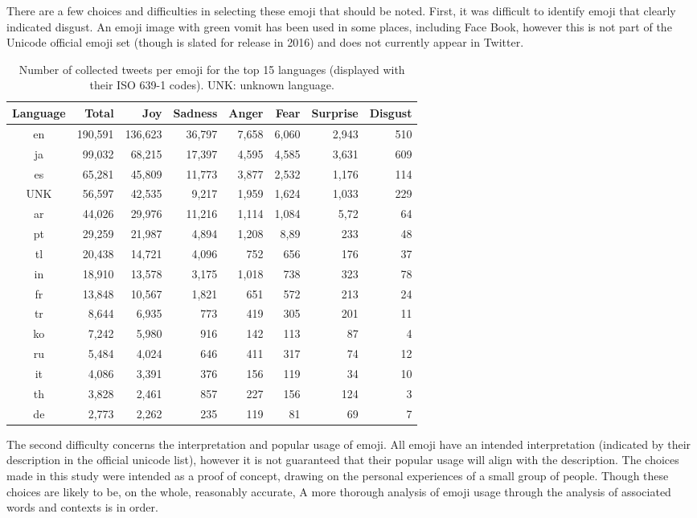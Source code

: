 \documentclass[10pt, a4paper]{article}
\begin{document}
There are a few choices and difficulties in selecting these emoji that should be noted.
First, it was difficult to identify emoji that clearly indicated disgust. 
An emoji image with green vomit has been used in some places, including Face Book, however this is not part of the Unicode official emoji set (though is slated for release in 2016) and does not currently appear in Twitter.

\begin{table*}
\centering
	\begin{tabular}{c | r | r | r | r | r | r | r}
\textbf{Language} & \textbf{Total} & \textbf{Joy} & \textbf{Sadness} & \textbf{Anger} & \textbf{Fear} & \textbf{Surprise} & \textbf{Disgust}  \\\hline
en  & 190,591 & 136,623 & 36,797 & 7,658 & 6,060 & 2,943 & 510 \\
ja  & 99,032 & 68,215 & 17,397 & 4,595 & 4,585 & 3,631 & 609 \\
es  & 65,281 & 45,809 & 11,773 & 3,877 & 2,532 & 1,176 & 114 \\
UNK  & 56,597 & 42,535 & 9,217 & 1,959 & 1,624 & 1,033 & 229\\
ar  & 44,026 & 29,976 & 11,216 & 1,114 & 1,084 & 5,72 & 64 \\
pt  & 29,259 & 21,987 & 4,894 & 1,208 & 8,89 & 233 & 48 \\
tl  & 20,438 & 14,721 & 4,096 & 752 & 656 & 176 & 37 \\
in  & 18,910 & 13,578 & 3,175 & 1,018 & 738 & 323 & 78 \\
fr  & 13,848 & 10,567 & 1,821 & 651 & 572 & 213 & 24\\
tr  & 8,644 & 6,935 & 773 & 419 & 305 & 201 & 11\\
ko  & 7,242 & 5,980 & 916 & 142 & 113 & 87 & 4\\
ru  & 5,484 & 4,024 & 646 & 411 & 317 & 74 & 12\\
it  & 4,086 & 3,391 & 376 & 156 & 119 & 34 & 10 \\
th  & 3,828 & 2,461 & 857 & 227 & 156 & 124 & 3\\
de  & 2,773 & 2,262 & 235 & 119 & 81 & 69 & 7
\end{tabular}
	\caption{Number of collected tweets per emoji for the top 15 languages (displayed with their ISO 639-1 codes). UNK: unknown language.}
	\label{tbl:top-ten-langs}
\end{table*}

The second difficulty concerns the interpretation and popular usage of emoji. 
All emoji have an intended interpretation (indicated by their description in the official unicode list), however it is not guaranteed that their popular usage will align with the description. 
The choices made in this study were intended as a proof of concept, drawing on the personal experiences of a small group of people. 
Though these choices are likely to be, on the whole, reasonably accurate, 
A more thorough analysis of 
emoji usage through the analysis of associated words and contexts is in order. 
\end{document}
